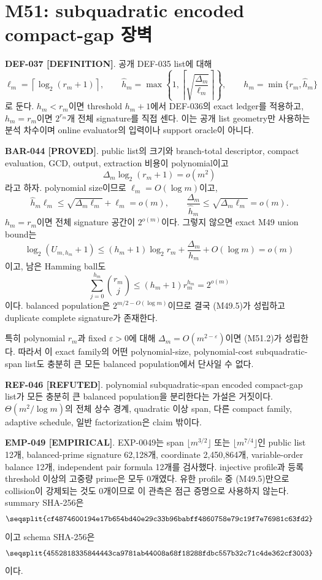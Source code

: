 \documentclass[11pt]{article}
\newcommand{\claimstatus}[2]{\textbf{#1 [#2]}}
\begin{document}
\section{M51: subquadratic encoded compact-gap 장벽}

\claimstatus{DEF-037}{DEFINITION}.
공개 DEF-035 list에 대해
\[
\ell_m=\left\lceil\log_2(r_m+1)\right\rceil,\qquad
\widehat h_m=
\max\left\{1,
\left\lceil\sqrt{\frac{\Delta_m}{\ell_m}}\right\rceil
\right\},
\qquad
h_m=\min\{r_m,\widehat h_m\}
\tag{M51.1}
\]
로 둔다. \(h_m<r_m\)이면 threshold \(h_m+1\)에서 DEF-036의 exact
ledger를 적용하고, \(h_m=r_m\)이면 \(2^{r_m}\)개 전체 signature를
직접 센다. 이는 공개 list geometry만 사용하는 분석 차수이며 online
evaluator의 입력이나 support oracle이 아니다.

\claimstatus{BAR-044}{PROVED}.
public list의 크기와 branch-total descriptor, compact evaluation, GCD,
output, extraction 비용이 polynomial이고
\[
\Delta_m\log_2(r_m+1)=o(m^2)
\tag{M51.2}
\]
라고 하자. polynomial size이므로 \(\ell_m=O(\log m)\)이고,
\[
\widehat h_m\ell_m
\le\sqrt{\Delta_m\ell_m}+\ell_m=o(m),
\qquad
\frac{\Delta_m}{\widehat h_m}
\le\sqrt{\Delta_m\ell_m}=o(m).
\tag{M51.3}
\]
\(h_m=r_m\)이면 전체 signature 공간이 \(2^{o(m)}\)이다.
그렇지 않으면 exact M49 union bound는
\[
\log_2(U_{m,h_m}+1)
\le(h_m+1)\log_2r_m+\frac{\Delta_m}{h_m}+O(\log m)
=o(m)
\tag{M51.4}
\]
이고, 남은 Hamming ball도
\[
\sum_{j=0}^{h_m}\binom{r_m}{j}
\le(h_m+1)r_m^{h_m}=2^{o(m)}
\tag{M51.5}
\]
이다. balanced population은 \(2^{m/2-O(\log m)}\)이므로 결국
(M49.5)가 성립하고 duplicate complete signature가 존재한다.

특히 polynomial \(r_m\)과 fixed \(\varepsilon>0\)에 대해
\(\Delta_m=O(m^{2-\varepsilon})\)이면 (M51.2)가 성립한다. 따라서
이 exact family의 어떤 polynomial-size, polynomial-cost
subquadratic-span list도 충분히 큰 모든 balanced population에서
단사일 수 없다.

\claimstatus{REF-046}{REFUTED}.
polynomial subquadratic-span encoded compact-gap list가 모든 충분히 큰
balanced population을 분리한다는 가설은 거짓이다.
\(\Theta(m^2/\log m)\)의 전체 상수 경계, quadratic 이상 span, 다른
compact family, adaptive schedule, 일반 factorization은 claim 밖이다.

\claimstatus{EMP-049}{EMPIRICAL}.
EXP-0049는 span \(\lfloor m^{3/2}\rfloor\) 또는
\(\lfloor m^{7/4}\rfloor\)인 public list 12개, balanced-prime
signature 62,128개, coordinate 2,450,864개, variable-order balance
12개, independent pair formula 12개를 검사했다. injective profile과
등록 threshold 이상의 고중량 prime은 모두 0개였다. 유한 profile 중
(M49.5)만으로 collision이 강제되는 것도 0개이므로 이 관측은 점근
증명으로 사용하지 않는다. summary SHA-256은
\[
\texttt{\seqsplit{cf4874600194e17b654bd40e29c33b96babff4860758e79c19f7e76981c63fd2}}
\]
이고 schema SHA-256은
\[
\texttt{\seqsplit{4552818335844443ca9781ab44008a68f18288fdbc557b32c71c4de362cf3003}}
\]
이다.
\end{document}
